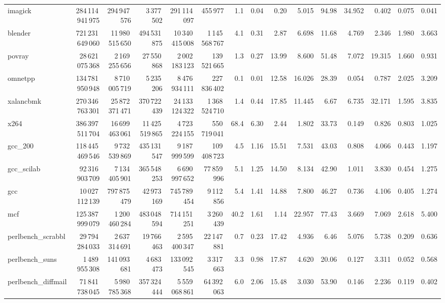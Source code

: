 \documentclass[9pt,landscape,a4paper]{article}
\begin{document}
\begin{adjustbox}{max width=\textwidth, max totalheight=0.50\textheight}
\begin{tabular}{lrrrrrrrrrrrrrr}
imagick & 284\,114\,941\,975 & 294\,947\,576 & 3\,377\,502 & 291\,114\,097 & 455\,977 & 1.1 & 0.04 & 0.20 & 5.015 & 94.98 & 34.952 & 0.402 & 0.075 & 0.041 \\
blender & 721\,231\,649\,060 & 11\,980\,515\,650 & 494\,531\,875 & 10\,340\,415\,008 & 1\,145\,568\,767 & 4.1 & 0.31 & 2.87 & 6.698 & 11.68 & 4.769 & 2.346 & 1.980 & 3.663 \\
povray & 28\,621\,075\,368 & 2\,169\,255\,656 & 27\,550\,868 & 2\,002\,183\,123 & 139\,521\,665 & 1.3 & 0.27 & 13.99 & 8.600 & 51.48 & 7.072 & 19.315 & 1.660 & 0.931 \\
omnetpp & 134\,781\,950\,948 & 8\,710\,005\,719 & 5\,235\,206 & 8\,476\,934\,111 & 227\,836\,402 & 0.1 & 0.01 & 12.58 & 16.026 & 28.39 & 0.054 & 0.787 & 2.025 & 3.209 \\
xalancbmk & 270\,346\,763\,301 & 25\,872\,371\,471 & 370\,722\,439 & 24\,133\,124\,322 & 1\,368\,524\,710 & 1.4 & 0.44 & 17.85 & 11.445 & 6.67 & 6.735 & 32.171 & 1.595 & 3.835 \\
x264 & 386\,397\,511\,704 & 16\,699\,463\,061 & 11\,425\,519\,865 & 4\,723\,224\,155 & 550\,719\,041 & 68.4 & 6.30 & 2.44 & 1.802 & 33.73 & 0.149 & 0.826 & 0.803 & 1.025 \\
gcc\_200 & 118\,445\,469\,546 & 9\,732\,539\,869 & 435\,131\,547 & 9\,187\,999\,599 & 109\,408\,723 & 4.5 & 1.16 & 15.51 & 7.531 & 43.03 & 0.808 & 4.066 & 0.443 & 1.197 \\
gcc\_scilab & 92\,316\,903\,709 & 7\,134\,405\,901 & 365\,548\,253 & 6\,690\,997\,652 & 77\,859\,996 & 5.1 & 1.25 & 14.50 & 8.134 & 42.90 & 1.011 & 3.830 & 0.454 & 1.275 \\
gcc & 10\,027\,112\,139 & 797\,875\,479 & 42\,973\,169 & 745\,789\,454 & 9\,112\,856 & 5.4 & 1.41 & 14.88 & 7.800 & 46.27 & 0.736 & 4.106 & 0.405 & 1.274 \\
mcf & 125\,387\,999\,079 & 1\,200\,460\,284 & 483\,048\,594 & 714\,151\,251 & 3\,260\,439 & 40.2 & 1.61 & 1.14 & 22.957 & 77.43 & 3.669 & 7.069 & 2.618 & 5.400 \\
perlbench\_scrabbl & 29\,794\,284\,033 & 2\,637\,314\,691 & 19\,766\,463 & 2\,595\,400\,347 & 22\,147\,881 & 0.7 & 0.23 & 17.42 & 4.936 & 6.46 & 5.076 & 5.738 & 0.209 & 0.636 \\
perlbench\_suns & 1\,489\,955\,308 & 141\,093\,681 & 4\,683\,473 & 133\,092\,545 & 3\,317\,663 & 3.3 & 0.98 & 17.87 & 4.620 & 20.06 & 0.127 & 3.311 & 0.052 & 0.568 \\
perlbench\_diffmail & 71\,841\,738\,045 & 5\,980\,785\,368 & 357\,324\,444 & 5\,559\,068\,861 & 64\,392\,063 & 6.0 & 2.06 & 15.48 & 3.030 & 53.90 & 0.146 & 2.236 & 0.119 & 0.402 \\

\end{tabular}
\end{adjustbox}
\end{document}

